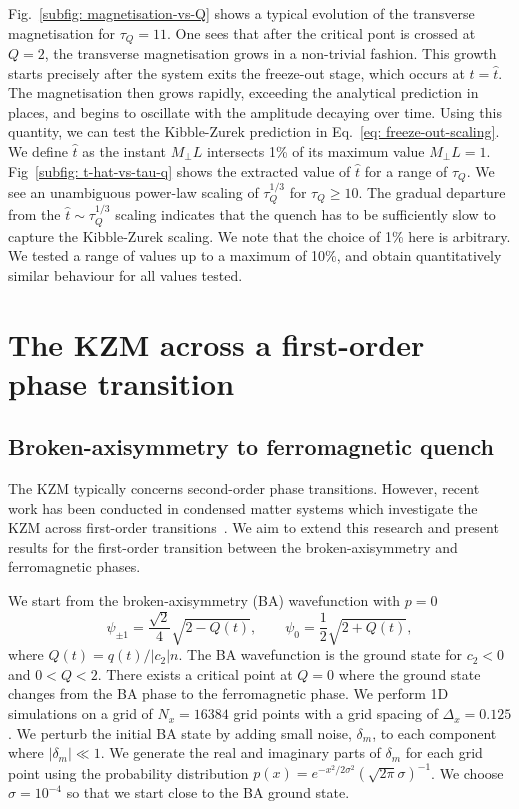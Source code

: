 Fig.~\ref{subfig: magnetisation-vs-Q} shows a typical evolution of the
transverse magnetisation for $\tau_Q = 11$.
One sees that after the critical pont is crossed at $Q=2$, the transverse
magnetisation grows in a non-trivial fashion.
This growth starts precisely after the system exits the freeze-out stage, which
occurs at $t=\hat{t}$.
The magnetisation then grows rapidly, exceeding the analytical prediction in
places, and begins to oscillate with the amplitude decaying over time.
Using this quantity, we can test the Kibble-Zurek prediction in
Eq.~\eqref{eq: freeze-out-scaling}.
We define $\hat{t}$ as the instant $M_\perp L$ intersects 1\% of its maximum
value $M_\perp L = 1$.
Fig~\ref{subfig: t-hat-vs-tau-q} shows the extracted value of $\hat{t}$ for a
range of $\tau_Q$.
We see an unambiguous power-law scaling of $\tau_Q^{1/3}$ for $\tau_Q \geq 10$.
The gradual departure from the $\hat{t} \sim \tau_Q^{1/3}$ scaling indicates
that the quench has to be sufficiently slow to capture the Kibble-Zurek scaling.
We note that the choice of 1\% here is arbitrary.
We tested a range of values up to a maximum of 10\%, and obtain quantitatively
similar behaviour for all values tested.

\section{The KZM across a first-order phase transition}
\subsection{Broken-axisymmetry to ferromagnetic quench}
The KZM typically concerns second-order phase transitions. However, recent
work has been conducted in condensed matter systems which investigate
the KZM across first-order transitions~\cite{Qiu2020}.
We aim to extend this research and present results for
the first-order transition between the broken-axisymmetry and
ferromagnetic phases.

We start from the broken-axisymmetry (BA) wavefunction with $p=0$
\begin{equation}
    \psi_{\pm 1} = \frac{\sqrt{2}}{4}\sqrt{2 - Q(t)}, \qquad
    \psi_0 = \frac{1}{2}\sqrt{2 + Q(t)},
    \label{eq: BA-initial-wavefunction}
\end{equation}
where $Q(t)=q(t)/|c_2|n$.
The BA wavefunction is the ground state for $c_2 < 0$ and $0 < Q < 2$.
There exists a critical point at $Q=0$ where the ground state changes from
the BA phase to the ferromagnetic phase.
We perform 1D simulations on a grid of $N_x = 16384$ grid points with a grid
spacing of $\Delta_x = 0.125$.
We perturb the initial BA state by adding small noise, $\delta_m$, to each
component where $|\delta_m| \ll 1$.
We generate the real and imaginary parts of $\delta_m$ for each grid point
using the probability distribution
$p(x) = e^{-x^2/2\sigma^2}(\sqrt{2\pi}\sigma)^{-1}$.
We choose $\sigma=10^{-4}$ so that we start close to the BA ground state.

